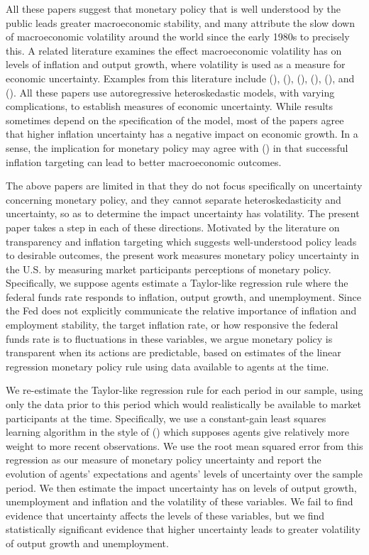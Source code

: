 \documentclass[12pt]{article}
\newcommand{\citee}[1]{\citename{#1} (\citeyear{#1})}
\begin{document}
All these papers suggest that monetary policy that is well understood by the public leads greater macroeconomic stability, and many attribute the slow down of macroeconomic volatility around the world since the early 1980s to precisely this.  A related literature examines the effect macroeconomic volatility has on levels of inflation and output growth, where volatility is used as a measure for economic uncertainty.  Examples from this literature include \citee{grier_perry2000}, \citee{fountas2001}, \citee{fountas2002}, \citee{grier2004}, \citee{fountas2006}, and \citee{fountas2007}.  All these papers use autoregressive heteroskedastic models, with varying complications, to establish measures of economic uncertainty.  While results sometimes depend on the specification of the model, most of the papers agree that higher inflation uncertainty has a negative impact on economic growth.  In a sense, the implication for monetary policy may agree with \citee{bernanke1997} in that successful inflation targeting can lead to better macroeconomic outcomes.

The above papers are limited in that they do not focus specifically on uncertainty concerning monetary policy, and they cannot separate heteroskedasticity and uncertainty, so as to determine the impact uncertainty has volatility.  The present paper takes a step in each of these directions.  Motivated by the literature on transparency and inflation targeting which suggests well-understood policy leads to desirable outcomes, the present work measures monetary policy uncertainty in the U.S. by measuring market participants perceptions of monetary policy.  Specifically, we suppose agents estimate a Taylor-like regression rule where the federal funds rate responds to inflation, output growth, and unemployment.  Since the Fed does not explicitly communicate the relative importance of inflation and employment stability, the target inflation rate, or how responsive the federal funds rate is to fluctuations in these variables, we argue monetary policy is transparent when its actions are predictable, based on estimates of the linear regression monetary policy rule using data available to agents at the time.  

We re-estimate the Taylor-like regression rule for each period in our sample, using only the data prior to this period which would realistically be available to market participants at the time.  Specifically, we use a constant-gain least squares learning algorithm in the style of \citee{evanshonka2001} which supposes agents give relatively more weight to more recent observations.  We use the root mean squared error from this regression as our measure of monetary policy uncertainty and report the evolution of agents' expectations and agents' levels of uncertainty over the sample period.  We then estimate the impact uncertainty has on levels of output growth, unemployment and inflation and the volatility of these variables.  We fail to find evidence that uncertainty affects the levels of these variables, but we find statistically significant evidence that higher uncertainty leads to greater volatility of output growth and unemployment.
\end{document}
